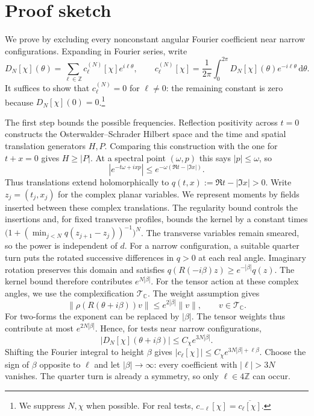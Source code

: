 \documentclass[11pt, letterpaper, reqno]{amsart}
\theoremstyle{definition}
\theoremstyle{remark}
\newcommand{\bbC}{\mathbb{C}}
\newcommand{\bbZ}{\mathbb{Z}}
\newcommand{\calT}{\mathcal{T}}
\newcommand{\dd}{\,\mathrm{d}}
\begin{document}
\section{Proof sketch}\label{sec:sketch}

We prove  by excluding every nonconstant angular
Fourier coefficient near narrow configurations. Expanding in Fourier
series, write
\begin{equation}\label{eq:fourier_integral}
 D_N[\chi](\theta)=\sum_{\ell\in\bbZ}c_\ell^{(N)}[\chi]e^{i\ell\theta},
 \qquad c_\ell^{(N)}[\chi]=\frac1{2\pi}\int_0^{2\pi}
 D_N[\chi](\theta)e^{-i\ell\theta}\dd\theta.
\end{equation}
It suffices to show that $c_\ell^{(N)}=0$ for $\ell\neq0$: the
remaining constant is zero because $D_N[\chi](0)=0$.\footnote{We
suppress $N,\chi$ when possible. For real tests,
$c_{-\ell}[\chi]=\overline{c_\ell[\chi]}$.}

The first step bounds the possible frequencies. Reflection positivity
across $t=0$ constructs the Osterwalder--Schrader Hilbert space and
the time and spatial translation generators $H,P$. Comparing this
construction with the one for $t+x=0$ gives $H\geq|P|$. At a spectral
point $(\omega,p)$ this says $|p|\leq\omega$, so
\[
 |e^{-t\omega+ixp}|\leq
 e^{-\omega(\Re t-|\Im x|)}.
\]
Thus translations extend holomorphically to
$q(t,x):=\Re t-|\Im x|>0$. Write $z_j=(t_j,x_j)$ for the complex
planar variables. We represent moments by fields inserted between
these complex translations. The regularity bound controls the
insertions and, for fixed transverse profiles, bounds the kernel by
a constant times $\bigl(1+(\min_{j<N}q(z_{j+1}-z_j))^{-1}\bigr)^N$.
The transverse variables remain smeared, so the power is independent of $d$.
For a narrow configuration, a suitable quarter turn puts the rotated
successive differences in $q>0$ at each real angle. Imaginary rotation
preserves this domain and satisfies
$q(R(-i\beta)z)\geq e^{-|\beta|}q(z)$. The kernel bound therefore
contributes $e^{N|\beta|}$. For the tensor action at these complex
angles, we use the complexification $\calT_\bbC$. The weight assumption
gives
\begin{equation}\label{eq:tensor-growth}
 \|\rho(R(\theta+i\beta))v\|\leq e^{2|\beta|}\|v\|,
 \qquad v\in\calT_\bbC.
\end{equation}
For two-forms the exponent can be replaced by $|\beta|$.
The tensor weights thus contribute at most $e^{2N|\beta|}$.
Hence, for tests near narrow configurations,
\begin{equation}\label{eq:angular-growth-preview}
 |D_N[\chi](\theta+i\beta)|\leq C_\chi e^{3N|\beta|}.
\end{equation}
Shifting the Fourier integral to height $\beta$ gives
$|c_\ell[\chi]|\leq C_\chi e^{3N|\beta|+\ell\beta}$.
Choose the sign of $\beta$ opposite to $\ell$ and let
$|\beta|\to\infty$: every coefficient with $|\ell|>3N$ vanishes.
The quarter turn is already a symmetry, so only $\ell\in4\bbZ$
can occur.
\end{document}
